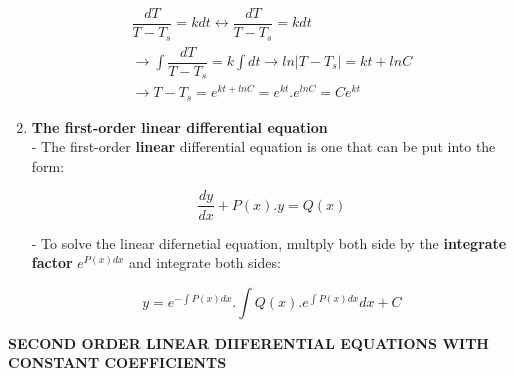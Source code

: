 \documentclass[10pt]{article}
\begin{document}
\begin{enumerate}
\begin{center}
	\begin{align}
	\dfrac{dT}{T-T_s} = kdt \leftrightarrow \dfrac{dT}{T-T_s} = kdt \\
	\rightarrow \displaystyle \int \dfrac{dT}{T-T_s} = k \int dt \rightarrow ln|T-T_s| = kt + lnC \\
	\rightarrow T -T_s = e^{kt + lnC} = e^{kt}.e^{lnC} = Ce^{kt}
	\end{align}
	\end{center}
	\item \textbf{The first-order linear differential equation}\\
	- The first-order \textbf{linear} differential equation is one that can be put into the form:
	\begin{mybox}
	\begin{center}
	\begin{equation}
	\dfrac{dy}{dx} + P(x).y = Q(x)
	\end{equation}
	\end{center}
	\end{mybox}
	- To solve the linear difernetial equation, multply both side by the \textbf{integrate factor} $e^{P(x)dx}$ and integrate both sides:
	\begin{mybox}
	\begin{center}
	\begin{equation}
	y = e^{- \int P(x)dx}.{\displaystyle \int Q(x).e^{\int P(x)dx}dx + C}
	\end{equation}
	\end{center}
	\end{mybox}
\end{enumerate}
\pagebreak
\begin{center}
\textbf{SECOND ORDER LINEAR DIIFERENTIAL EQUATIONS WITH CONSTANT COEFFICIENTS}
\end{center}
\end{document}
